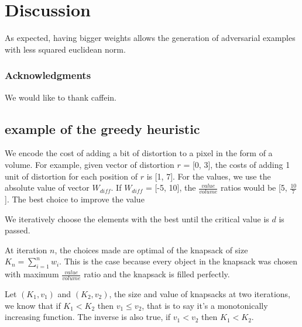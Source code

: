 \documentclass{article} %
\begin{document}


\section{Discussion}

As expected, having bigger weights allows the generation of adversarial examples with less
squared euclidean norm.


\subsubsection*{Acknowledgments}
We would like to thank caffein.








\newpage




\subsection{example of the greedy heuristic}

We encode the cost of adding a bit of distortion to a pixel in the form of a
volume. For example, given vector of distortion $r$ = [0, 3], the costs of
adding 1 unit of distortion for each position of $r$ is [1, 7]. For the values,
we use the absolute value of vector $W_{diff}$. If $W_{diff}$ = [-5, 10], the 
$\frac {value} {volume}$ ratios would be [5, $\frac{10}{7}$]. The best choice
to improve the value 

We iteratively choose the elements with the best until
the critical value is $d$ is passed.

At iteration $n$, the choices made are optimal of the knapsack of size
$K_n = \sum\limits_{i=1}^n w_i$. This is the case because every object in the
knapsack was chosen with maximum $\frac{value} {volume}$ ratio and the knapsack
is filled perfectly.

Let $(K_1, v_1)$ and $(K_2, v_2)$, the size and value of knapsacks at two
iterations, we know that if $K_1 < K_2$ then $v_1 \leq v_2$, that is to say
it's a monotonically increasing function. The inverse is also true, if
$v_1 < v_2$ then $K_1 < K_2$.
\end{document}
